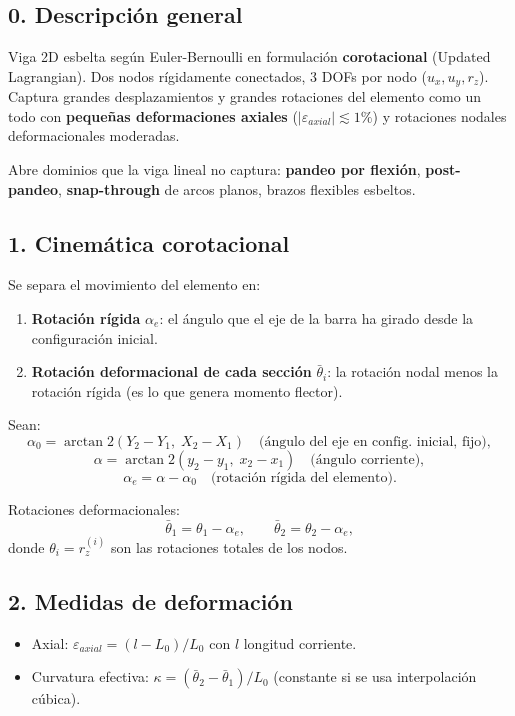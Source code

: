 \documentclass[11pt,letterpaper,oneside]{report}
\begin{document}
\subsection{0. Descripción general}
Viga 2D esbelta según Euler-Bernoulli en formulación \textbf{corotacional} (Updated Lagrangian). Dos nodos rígidamente conectados, 3 DOFs por nodo ($u_x, u_y, r_z$). Captura grandes desplazamientos y grandes rotaciones del elemento como un todo con \textbf{pequeñas deformaciones axiales} ($|\varepsilon_{axial}| \lesssim 1\%$) y rotaciones nodales deformacionales moderadas.

Abre dominios que la viga lineal no captura: \textbf{pandeo por flexión}, \textbf{post-pandeo}, \textbf{snap-through} de arcos planos, brazos flexibles esbeltos.

\subsection{1. Cinemática corotacional}
Se separa el movimiento del elemento en:

\begin{enumerate}
  \item \textbf{Rotación rígida} $\alpha_e$: el ángulo que el eje de la barra ha girado desde la configuración inicial.
  \item \textbf{Rotación deformacional de cada sección} $\bar\theta_i$: la rotación nodal menos la rotación rígida (es lo que genera momento flector).
\end{enumerate}

Sean:
\[
\alpha_0 = \arctan2(Y_2 - Y_1,\; X_2 - X_1) \quad \text{(ángulo del eje en config. inicial, fijo)},
\]
\[
\alpha = \arctan2(y_2 - y_1,\; x_2 - x_1) \quad \text{(ángulo corriente)},
\]
\[
\alpha_e = \alpha - \alpha_0 \quad \text{(rotación rígida del elemento)}.
\]

Rotaciones deformacionales:
\[
\bar\theta_1 = \theta_1 - \alpha_e, \qquad \bar\theta_2 = \theta_2 - \alpha_e,
\]
donde $\theta_i = r_z^{(i)}$ son las rotaciones totales de los nodos.

\subsection{2. Medidas de deformación}
\begin{itemize}
  \item Axial: $\varepsilon_{axial} = (l - L_0)/L_0$ con $l$ longitud corriente.
  \item Curvatura efectiva: $\kappa = (\bar\theta_2 - \bar\theta_1)/L_0$ (constante si se usa interpolación cúbica).
\end{itemize}
\end{document}

